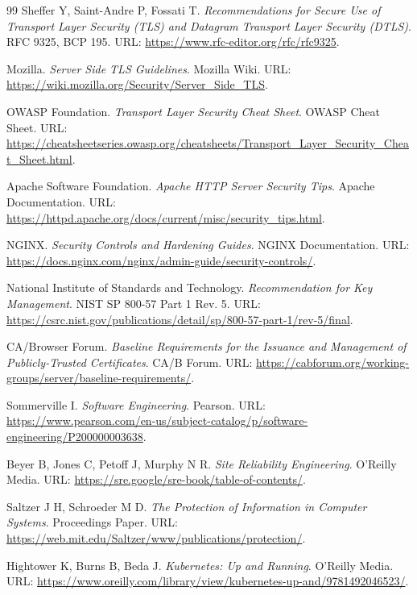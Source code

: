 \documentclass[12pt,a4paper,fontset=none]{ctexart}
\begin{document}
\begin{thebibliography}{99}
Sheffer Y, Saint-Andre P, Fossati T. \textit{Recommendations for Secure Use of Transport Layer Security (TLS) and Datagram Transport Layer Security (DTLS)}. RFC 9325, BCP 195. URL: \url{https://www.rfc-editor.org/rfc/rfc9325}.

Mozilla. \textit{Server Side TLS Guidelines}. Mozilla Wiki. URL: \url{https://wiki.mozilla.org/Security/Server_Side_TLS}.

OWASP Foundation. \textit{Transport Layer Security Cheat Sheet}. OWASP Cheat Sheet. URL: \url{https://cheatsheetseries.owasp.org/cheatsheets/Transport_Layer_Security_Cheat_Sheet.html}.

Apache Software Foundation. \textit{Apache HTTP Server Security Tips}. Apache Documentation. URL: \url{https://httpd.apache.org/docs/current/misc/security_tips.html}.

NGINX. \textit{Security Controls and Hardening Guides}. NGINX Documentation. URL: \url{https://docs.nginx.com/nginx/admin-guide/security-controls/}.

National Institute of Standards and Technology. \textit{Recommendation for Key Management}. NIST SP 800-57 Part 1 Rev. 5. URL: \url{https://csrc.nist.gov/publications/detail/sp/800-57-part-1/rev-5/final}.

CA/Browser Forum. \textit{Baseline Requirements for the Issuance and Management of Publicly-Trusted Certificates}. CA/B Forum. URL: \url{https://cabforum.org/working-groups/server/baseline-requirements/}.

Sommerville I. \textit{Software Engineering}. Pearson. URL: \url{https://www.pearson.com/en-us/subject-catalog/p/software-engineering/P200000003638}.

Beyer B, Jones C, Petoff J, Murphy N R. \textit{Site Reliability Engineering}. O'Reilly Media. URL: \url{https://sre.google/sre-book/table-of-contents/}.

Saltzer J H, Schroeder M D. \textit{The Protection of Information in Computer Systems}. Proceedings Paper. URL: \url{https://web.mit.edu/Saltzer/www/publications/protection/}.

Hightower K, Burns B, Beda J. \textit{Kubernetes: Up and Running}. O'Reilly Media. URL: \url{https://www.oreilly.com/library/view/kubernetes-up-and/9781492046523/}.

\end{thebibliography}
\end{document}
